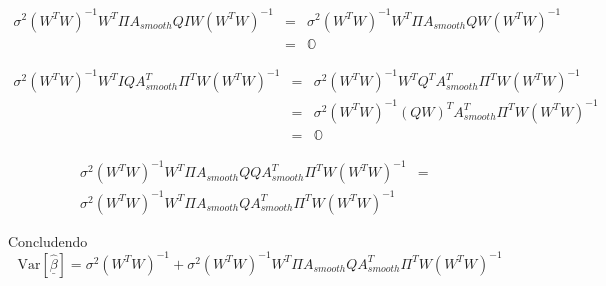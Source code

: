 \documentclass[a4paper,12pt]{report}				%
\begin{document}
\begin{eqnarray*}
\sigma^2 (W^TW)^{-1}W^T \Pi A_{smooth}Q I W(W^TW)^{-1} &=& \sigma^2 (W^TW)^{-1}W^T \Pi A_{smooth}Q W(W^TW)^{-1} \\
	&=& \mathbb{O}
\end{eqnarray*}

\begin{eqnarray*}
\sigma^2 (W^TW)^{-1}W^T I Q A_{smooth}^T \Pi^T W(W^TW)^{-1} &=& \sigma^2 (W^TW)^{-1}W^T Q^T A_{smooth}^T \Pi^T W(W^TW)^{-1} \\
	&=& \sigma^2 (W^TW)^{-1}(QW)^T A_{smooth}^T \Pi^T W(W^TW)^{-1}\\
	&=& \mathbb{O}
\end{eqnarray*}

\begin{eqnarray*}
\sigma^2 (W^TW)^{-1}W^T \Pi A_{smooth} Q Q A_{smooth}^T \Pi^T W(W^TW)^{-1} &=& \\
\sigma^2 (W^TW)^{-1}W^T \Pi A_{smooth} Q A_{smooth}^T \Pi^T W(W^TW)^{-1}
\end{eqnarray*}

Concludendo
$$
\mathrm{Var}[\underline{\hat{\beta}}] = \sigma^2 (W^TW)^{-1} + \sigma^2 (W^TW)^{-1}W^T \Pi A_{smooth} Q A_{smooth}^T \Pi^T W(W^TW)^{-1}
$$
\end{document}

